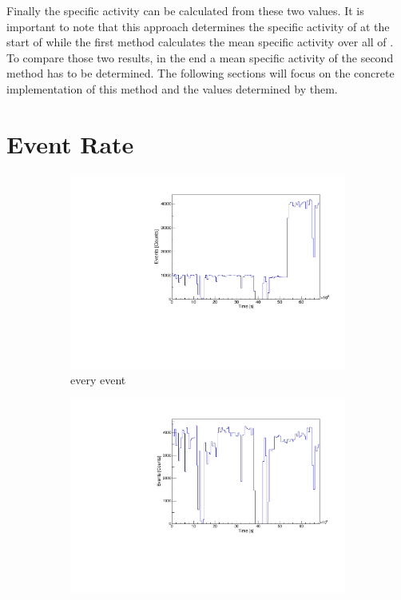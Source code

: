 \documentclass[encoding=utf8,british]{tumphthesis}
\begin{document}
Finally the specific activity can be calculated from these two values.
It is important to note that this approach determines the specific activity of \Kr at the start of \PII while the first method calculates the mean specific activity over all of \PII.
To compare those two results, in the end a mean specific activity of the second method has to be determined.
The following sections will focus on the concrete implementation of this method and the values determined by them.
\\

\section{Event Rate}
\label{sec:EventAct}

\begin{figure}[t!]
	\centering
	\begin{subfigure}{.5\textwidth}
		\centering
		\includegraphics[width=\textwidth]{./Bilder/ZeitverlaufALLE.pdf}
		\caption{every event}
		\label{fig:ZeitAll}
	\end{subfigure}%
	\begin{subfigure}{.5\textwidth}
		\centering
		\includegraphics[width=\textwidth]{./Bilder/ZeitverlaufLimits.pdf}

\end{subfigure}
\end{figure}
\end{document}
